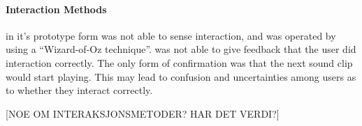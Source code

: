 \paragraph{Interaction Methods}
\buddy{} in it's prototype form was not able to sense interaction, and was operated by using a ``Wizard-of-Oz technique''\cite{wilson1988rapid}. \buddy{} was not able to give feedback that the user did interaction correctly. The only form of confirmation was that the next sound clip would start playing. This may lead to confusion and uncertainties among users as to whether they interact correctly. \iref{}

[NOE OM INTERAKSJONSMETODER? HAR DET VERDI?]




